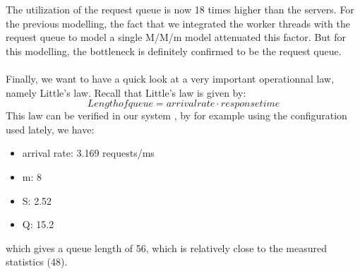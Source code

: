 \documentclass[11pt,a4paper]{article}
\begin{document}
 The utilization of the request queue is now 18 times higher than the servers. For the previous modelling, the fact that we integrated the worker threads with the request queue to model a single M/M/m model attenuated this factor. But for this modelling, the bottleneck is definitely confirmed to be the request queue. 
 \\
 \\
 Finally, we want to have a quick look at a very important operationnal law, namely Little's law. Recall that Little's law is given by: 
 \[Length of queue = arrival rate \cdot response time\]
 This law can be verified in our system , by for example using the configuration used lately, we have:
 \begin{itemize}
\item arrival rate: 3.169 requests/ms
\item m: 8
\item S: 2.52 
\item Q: 15.2
\end{itemize}
which gives a queue length of 56, which is relatively close to the measured statistics (48). 
 
 
\end{document}
